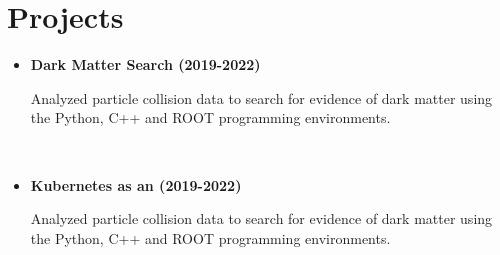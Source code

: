 
\section{Projects}


\begin{minipage}[t]{0.45\textwidth}

\begin{itemize}
\item \textbf{Dark Matter Search (2019-2022)}

Analyzed particle collision data to search for evidence of dark matter using the Python, C++ and ROOT programming environments.
\end{itemize}

\end{minipage}
\hfill\
\begin{minipage}[t]{0.45\textwidth}

\begin{itemize}
\item \textbf{Kubernetes as an  (2019-2022)}

Analyzed particle collision data to search for evidence of dark matter using the Python, C++ and ROOT programming environments.
\end{itemize}

\end{minipage}

